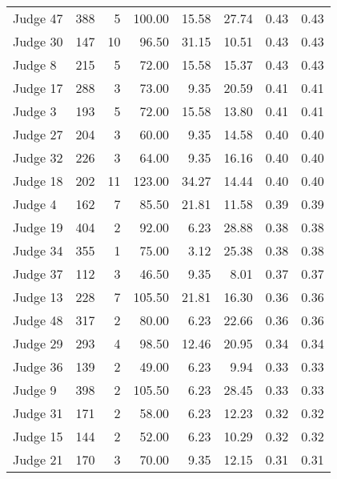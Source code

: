 \begin{tabular}{lrrrrrrr}
Judge 47 &   388 &      5 & 100.00 &      15.58 &     27.74 &         0.43 &      0.43 \\
Judge 30 &   147 &     10 &  96.50 &      31.15 &     10.51 &         0.43 &      0.43 \\
 Judge 8 &   215 &      5 &  72.00 &      15.58 &     15.37 &         0.43 &      0.43 \\
Judge 17 &   288 &      3 &  73.00 &       9.35 &     20.59 &         0.41 &      0.41 \\
 Judge 3 &   193 &      5 &  72.00 &      15.58 &     13.80 &         0.41 &      0.41 \\
Judge 27 &   204 &      3 &  60.00 &       9.35 &     14.58 &         0.40 &      0.40 \\
Judge 32 &   226 &      3 &  64.00 &       9.35 &     16.16 &         0.40 &      0.40 \\
Judge 18 &   202 &     11 & 123.00 &      34.27 &     14.44 &         0.40 &      0.40 \\
 Judge 4 &   162 &      7 &  85.50 &      21.81 &     11.58 &         0.39 &      0.39 \\
Judge 19 &   404 &      2 &  92.00 &       6.23 &     28.88 &         0.38 &      0.38 \\
Judge 34 &   355 &      1 &  75.00 &       3.12 &     25.38 &         0.38 &      0.38 \\
Judge 37 &   112 &      3 &  46.50 &       9.35 &      8.01 &         0.37 &      0.37 \\
Judge 13 &   228 &      7 & 105.50 &      21.81 &     16.30 &         0.36 &      0.36 \\
Judge 48 &   317 &      2 &  80.00 &       6.23 &     22.66 &         0.36 &      0.36 \\
Judge 29 &   293 &      4 &  98.50 &      12.46 &     20.95 &         0.34 &      0.34 \\
Judge 36 &   139 &      2 &  49.00 &       6.23 &      9.94 &         0.33 &      0.33 \\
 Judge 9 &   398 &      2 & 105.50 &       6.23 &     28.45 &         0.33 &      0.33 \\
Judge 31 &   171 &      2 &  58.00 &       6.23 &     12.23 &         0.32 &      0.32 \\
Judge 15 &   144 &      2 &  52.00 &       6.23 &     10.29 &         0.32 &      0.32 \\
Judge 21 &   170 &      3 &  70.00 &       9.35 &     12.15 &         0.31 &      0.31 \\

\end{tabular}

